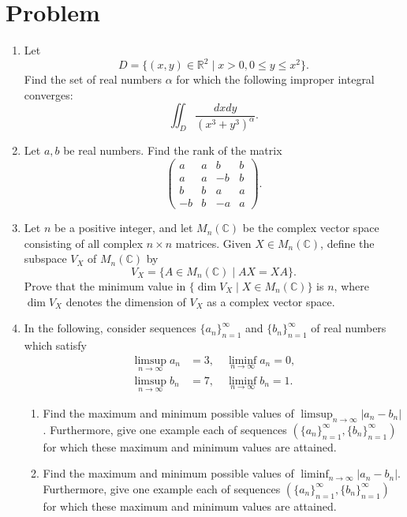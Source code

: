 \documentclass{article}
\begin{document}
\section*{Problem}
\begin{enumerate}[label=\fbox{\arabic*}]
  \item Let
        \[ D = \{ (x, y) \in \mathbb{R}^2 \mid x > 0, 0 \le y \le x^2 \}. \]
        Find the set of real numbers $\alpha$ for which the following improper integral converges:
        \[ \iint_D \frac{dx dy}{(x^3 + y^3)^\alpha}. \]

  \item Let $a, b$ be real numbers. Find the rank of the matrix
        \[ \begin{pmatrix} a & a & b & b \\ a & a & -b & b \\ b & b & a & a \\ -b & b & -a & a \end{pmatrix}. \]

  \item Let $n$ be a positive integer, and let $M_n(\mathbb{C})$ be the complex vector space consisting of all complex $n \times n$ matrices. Given $X \in M_n(\mathbb{C})$, define the subspace $V_X$ of $M_n(\mathbb{C})$ by
        \[ V_X = \{ A \in M_n(\mathbb{C}) \mid AX = XA \}. \]
        Prove that the minimum value in $\{ \dim V_X \mid X \in M_n(\mathbb{C}) \}$ is $n$, where $\dim V_X$ denotes the dimension of $V_X$ as a complex vector space.

  \item In the following, consider sequences $\{a_n\}_{n=1}^\infty$ and $\{b_n\}_{n=1}^\infty$ of real numbers which satisfy
        \begin{align*}
          \limsup_{n \to \infty} a_n &= 3, \quad \liminf_{n \to \infty} a_n = 0, \\
          \limsup_{n \to \infty} b_n &= 7, \quad \liminf_{n \to \infty} b_n = 1.
        \end{align*}
        \begin{enumerate}[label=(\arabic*)]
          \item Find the maximum and minimum possible values of $\limsup_{n \to \infty} |a_n - b_n|$. Furthermore, give one example each of sequences $(\{a_n\}_{n=1}^\infty, \{b_n\}_{n=1}^\infty)$ for which these maximum and minimum values are attained.
          \item Find the maximum and minimum possible values of $\liminf_{n \to \infty} |a_n - b_n|$. Furthermore, give one example each of sequences $(\{a_n\}_{n=1}^\infty, \{b_n\}_{n=1}^\infty)$ for which these maximum and minimum values are attained.
        \end{enumerate}


\end{enumerate}
\end{document}
